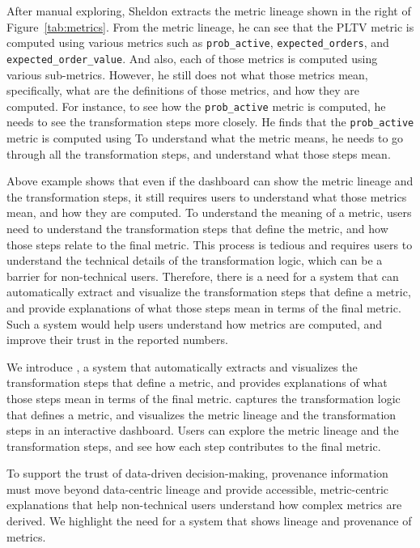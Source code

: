 \begin{example}
After manual exploring, Sheldon extracts the metric lineage shown in the right
of Figure~\ref{tab:metrics}. From the metric lineage, he can see that the PLTV
metric is computed using various metrics such as \texttt{prob\_active},
\texttt{expected\_orders}, and \texttt{expected\_order\_value}. And also, each
of those metrics is computed using various sub-metrics. However, he still does
not what those metrics mean, specifically, what are the definitions of those
metrics, and how they are computed. For instance, to see how the
\texttt{prob\_active} metric is computed, he needs to see the transformation
steps more closely. He finds that the \texttt{prob\_active} metric is computed
using  To understand what
the metric means, he needs to go through all the transformation steps, and
understand what those steps mean.
\end{example}

Above example shows that even if the dashboard can show the metric lineage and
the transformation steps, it still requires users to understand what those
metrics mean, and how they are computed. To understand the meaning of a metric,
users need to understand the transformation steps that define the metric, and
how those steps relate to the final metric. This process is tedious and requires
users to understand the technical details of the transformation logic, which can
be a barrier for non-technical users. Therefore, there is a need for a system
that can automatically extract and visualize the transformation steps that
define a metric, and provide explanations of what those steps mean in terms of
the final metric. Such a system would help users understand how metrics are
computed, and improve their trust in the reported numbers.

We introduce \clue, a system that automatically extracts and visualizes the
transformation steps that define a metric, and provides explanations of what
those steps mean in terms of the final metric. \clue captures the transformation
logic that defines a metric, and visualizes the metric lineage and the
transformation steps in an interactive dashboard. Users can explore the metric
lineage and the transformation steps, and see how each step contributes to the
final metric. 

To support the trust of data-driven decision-making, provenance information must
move beyond data-centric lineage and provide accessible, metric-centric
explanations that help non-technical users understand how complex metrics are
derived. We highlight the need for a system that shows lineage and provenance of
metrics.

